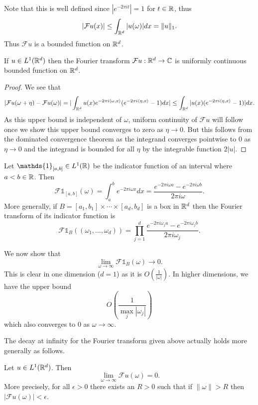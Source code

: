 \documentclass[twoside, a4paper, 10pt]{amsart}
\begin{document}
Note that this is well defined since $|e^{-2\pi it}| = 1$ for $t \in \mathbb{R}$, thus $$|\mathcal{F}u(x)| \leq \int_{\mathbb{R}^d} |u(\omega)| dx = \| u \|_1. $$ Thus $\mathcal{F}u$ is a bounded function on $\mathbb{R}^d$.

\begin{prop} If $u \in L^1(\mathbb{R}^d)$ then the Fourier transform $\mathcal{F}u:\mathbb{R}^d \to \mathbb{C}$ is  uniformly continuous bounded function on $\mathbb{R}^d$.

\end{prop}

\begin{proof} We see that $$|\mathcal{F}u(\omega + \eta) - \mathcal{F}u(\omega)| = |\int_{\mathbb{R}^d} u(x) e^{-2\pi i \langle \omega, x \rangle }(e^{-2\pi i \langle \eta, x \rangle}  - 1)dx| \leq \int_{\mathbb{R}^d} |u(x) (e^{-2\pi i \langle \eta, x \rangle}  - 1) |dx.$$ As this upper bound is independent of $\omega$, uniform continuity of $\mathcal{F}u$ will follow once we show this upper bound converges to zero as $\eta \to 0$. But this follows from the dominated convergence theorem as the integrand converges pointwise to $0$ as $\eta \to 0$ and the integrand is bounded for all $\eta$ by the integrable function $2|u| $. \end{proof}

\begin{eg} Let $\mathds{1}_{[a,b]} \in L^1(\bR)$ be the indicator function of an interval where $a<b \in \mathbb{R}$. Then $$\mathcal{F}\mathds{1}_{[a,b]}(\omega) = \int_a^b e^{-2\pi i \omega x} dx = \frac{e^{-2\pi i \omega a} - e^{-2\pi i \omega b}}{2\pi i \omega}.    $$ More generally, if $B = [a_1, b_1] \times \cdots \times [a_d, b_d]$ is a  box in $\mathbb{R}^d$ then the Fourier transform of its indicator function is $$\mathcal{F}\mathds{1}_B ((\omega_1, \ldots, \omega_d)) = \prod_{j=1}^d  \frac{e^{-2\pi i \omega_j a} - e^{-2\pi i \omega_j b}}{2\pi i \omega_j}.$$

We now show that $$\lim_{\omega \to \infty} \mathcal{F}\mathds{1}_B(\omega)  \to 0.$$ This is clear in one dimension ($d=1$) as it is $O(\frac{1}{|\omega|})$. In higher dimensions, we have the upper bound $$O(\frac{1}{\max_{j} |\omega_j|})$$ which also converges to $0$ as $\omega \to \infty$. 

\end{eg}

The decay at infinity for the Fourier transform given above actually holds more generally as follows.

\begin{thm} Let $u \in L^1(\mathbb{R}^d)$. Then $$\lim_{\omega \to \infty} \mathcal{F}u(\omega) = 0.$$ More precisely, for all $\epsilon>0$ there exists an $R>0$ such that if $\|\omega \|>R$ then $|\mathcal{F}u(\omega)| < \epsilon$.

\end{thm}
\end{document}
